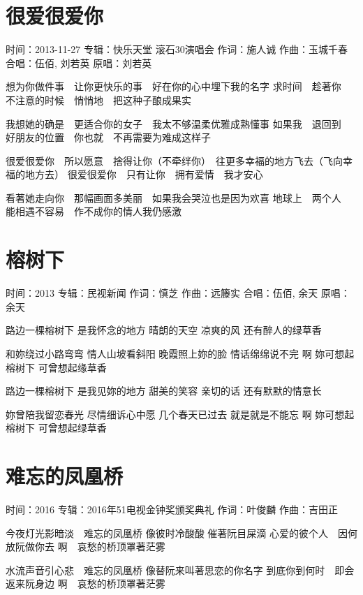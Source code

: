 \documentclass[UTF8,a4paper,oneside,twocolumn,12pt]{ctexbook}
\newcommand{\infopair}[2]{\textbullet #1：#2}
\newcommand{\zc}[1][伍佰]{\infopair{作词}{#1}}
\newcommand{\zq}[1][伍佰]{\infopair{作曲}{#1}}
\newcommand{\zj}[1]{\infopair{专辑}{#1}}
\newcommand{\yc}[1]{\infopair{原唱}{#1}}
\newcommand{\sj}[1]{\infopair{时间}{#1}}
\newenvironment{info}{\begin{flushleft}\kaishu
	}
	{\end{flushleft}\normalsize\yahei\par}
\newenvironment{lyric}{
	}
{}
\begin{document}
\section{很爱很爱你}
\begin{info}
	\sj{2013-11-27}
	\zj{快乐天堂 滚石30演唱会}
	\zc[施人诚]
	\zq[玉城千春]
	\infopair{合唱}{伍佰, 刘若英}
	\yc{刘若英}
\end{info}
\begin{lyric}
	想为你做件事　让你更快乐的事　好在你的心中埋下我的名字
	求时间　趁著你　不注意的时候　悄悄地　把这种子酿成果实

	我想她的确是　更适合你的女子　我太不够温柔优雅成熟懂事
	如果我　退回到　好朋友的位置　你也就　不再需要为难成这样子

	很爱很爱你　所以愿意　捨得让你（不牵绊你）　往更多幸福的地方飞去（飞向幸福的地方去）
	很爱很爱你　只有让你　拥有爱情　我才安心

	看著她走向你　那幅画面多美丽　如果我会哭泣也是因为欢喜
	地球上　两个人　能相遇不容易　作不成你的情人我仍感激
\end{lyric}

\section{榕树下}%
\begin{info}
	\sj{2013}
	\zj{民视新闻}
	\zc[慎芝]
	\zq[远籐实]
	\infopair{合唱}{伍佰, 余天}
	\yc{余天}
\end{info}
\begin{lyric}
	路边一棵榕树下 是我怀念的地方
	晴朗的天空 凉爽的风 还有醉人的绿草香

	和妳绕过小路弯弯 情人山坡看斜阳
	晚霞照上妳的脸 情话绵绵说不完 啊
	妳可想起榕树下 可曾想起缘草香

	路边一棵榕树下 是我见妳的地方
	甜美的笑容 亲切的话 还有默默的情意长

	妳曾陪我留恋春光 尽情细诉心中愿
	几个春天已过去 就是就是不能忘
	啊 妳可想起榕树下 可曾想起绿草香
\end{lyric}

\section{难忘的凤凰桥}
\begin{info}
	\sj{2016}
	\zj{2016年51电视金钟奖颁奖典礼}
	\zc[叶俊麟]
	\zq[吉田正]
\end{info}
\begin{lyric}
	今夜灯光影暗淡　难忘的凤凰桥
	像彼时冷酸酸 催著阮目屎滴
	心爱的彼个人　因何放阮做你去
	啊　哀愁的桥顶罩著茫雾

	水流声音引心悲　难忘的凤凰桥
	像替阮来叫著思恋的你名字
	到底你到何时　即会返来阮身边
	啊　哀愁的桥顶罩著茫雾
\end{lyric}
\end{document}
